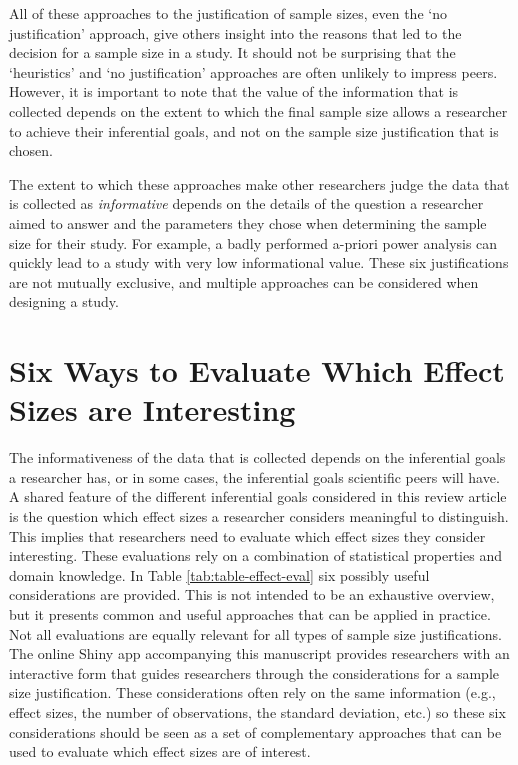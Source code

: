 \documentclass[
]{krantz}
\begin{document}
All of these approaches to the justification of sample sizes, even the `no justification' approach, give others insight into the reasons that led to the decision for a sample size in a study. It should not be surprising that the `heuristics' and `no justification' approaches are often unlikely to impress peers. However, it is important to note that the value of the information that is collected depends on the extent to which the final sample size allows a researcher to achieve their inferential goals, and not on the sample size justification that is chosen.

The extent to which these approaches make other researchers judge the data that is collected as \emph{informative} depends on the details of the question a researcher aimed to answer and the parameters they chose when determining the sample size for their study. For example, a badly performed a-priori power analysis can quickly lead to a study with very low informational value. These six justifications are not mutually exclusive, and multiple approaches can be considered when designing a study.

\hypertarget{six-ways-to-evaluate-which-effect-sizes-are-interesting}{%
\section{Six Ways to Evaluate Which Effect Sizes are Interesting}\label{six-ways-to-evaluate-which-effect-sizes-are-interesting}}

The informativeness of the data that is collected depends on the inferential goals a researcher has, or in some cases, the inferential goals scientific peers will have. A shared feature of the different inferential goals considered in this review article is the question which effect sizes a researcher considers meaningful to distinguish. This implies that researchers need to evaluate which effect sizes they consider interesting. These evaluations rely on a combination of statistical properties and domain knowledge. In Table \ref{tab:table-effect-eval} six possibly useful considerations are provided. This is not intended to be an exhaustive overview, but it presents common and useful approaches that can be applied in practice. Not all evaluations are equally relevant for all types of sample size justifications. The online Shiny app accompanying this manuscript provides researchers with an interactive form that guides researchers through the considerations for a sample size justification. These considerations often rely on the same information (e.g., effect sizes, the number of observations, the standard deviation, etc.) so these six considerations should be seen as a set of complementary approaches that can be used to evaluate which effect sizes are of interest.
\end{document}
